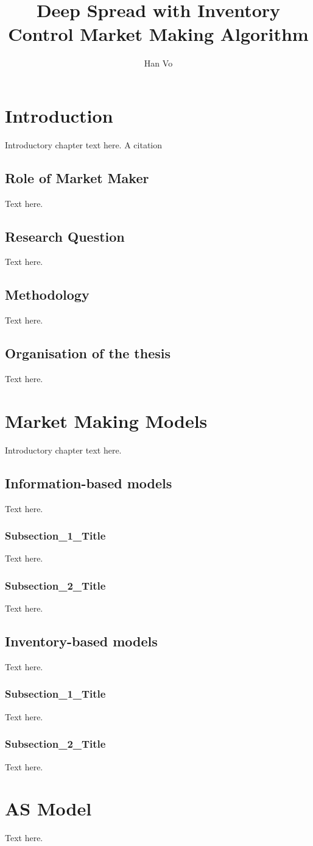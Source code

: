 \documentclass[review,los,12pt]{ryethesis}
\author{Han Vo}
\title{Deep Spread with Inventory Control Market Making Algorithm}
\begin{document}
\chapter{Introduction}

Introductory chapter text here.
A citation~\cite{sample}
\section{Role of Market Maker}
Text here.
\section{Research Question}
Text here.
\section{Methodology}
Text here.
\section{Organisation of the thesis}
Text here.
\chapter{Market Making Models}
Introductory chapter text here.
\section{Information-based models}
Text here.
\subsection{Subsection\_1\_Title}
Text here.
\subsection{Subsection\_2\_Title}
Text here.
\section{Inventory-based models}
Text here.
\subsection{Subsection\_1\_Title}
Text here.
\subsection{Subsection\_2\_Title}
Text here.
\chapter{AS Model}
Text here.
\end{document}
